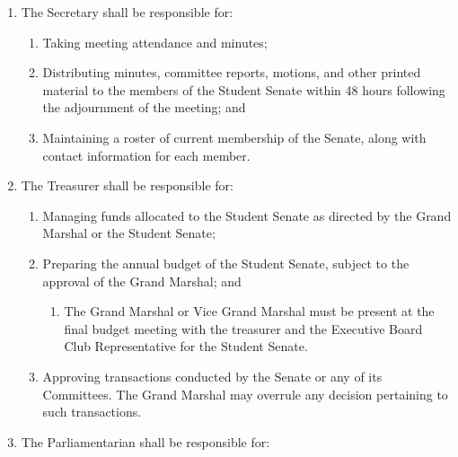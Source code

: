 \begin{enumerate}
\begin{enumerate}
  \item Meeting regularly with the Grand Marshal to discuss Senate issues;
  \item Acting as the substitute for the Grand Marshal at any meetings that the Grand Marshal cannot attend. At such a meeting, the Vice Grand Marshal shall not count towards quorum and may only vote to break a tie;
  \item Becoming familiar with the work of all the Senate committees, and assist committees in their duties;
  \item Assisting individual Senators that have been charged with investigating issues raised by petition; and
  \item Coordinating annual documentation folders with committee chairs to ensure continuity between years.
  \end{enumerate}
\item The Secretary shall be responsible for:
  \begin{enumerate}
  \item Taking meeting attendance and minutes;
  \item Distributing minutes, committee reports, motions, and other printed material to the members of the Student Senate within 48 hours following the adjournment of the meeting; and
  \item Maintaining a roster of current membership of the Senate, along with contact information for each member.
  \end{enumerate}
\item The Treasurer shall be responsible for:
  \begin{enumerate}
  \item Managing funds allocated to the Student Senate as directed by the Grand Marshal or the Student Senate;
  \item Preparing the annual budget of the Student Senate, subject to the approval of the Grand Marshal; and
    \begin{enumerate}
    \item The Grand Marshal or Vice Grand Marshal must be present at the final budget meeting with the treasurer and the Executive Board Club Representative for the Student Senate.
    \end{enumerate}
  \item Approving transactions conducted by the Senate or any of its Committees. The Grand Marshal may overrule any decision pertaining to such transactions.
  \end{enumerate}
\item The Parliamentarian shall be responsible for:

\end{enumerate}
